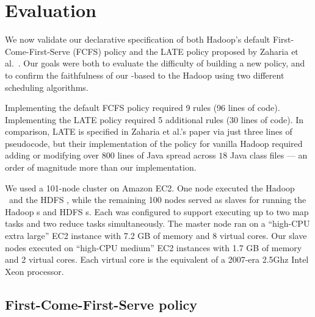 \section{Evaluation}
\label{ch:boom:sec:eval}

We now validate our declarative specification of both Hadoop's default
First-Come-First-Serve (FCFS) policy and the LATE policy proposed by Zaharia et
al.~\cite{late-sched}. Our goals were both to evaluate the difficulty of
building a new policy, and to confirm the faithfulness of our \OVERLOG-based
{\JT} to the Hadoop {\JT} using two different scheduling algorithms.

Implementing the default FCFS policy required 9 rules (96 lines of
code). Implementing the LATE policy required 5 additional \OVERLOG rules (30
lines of code). In comparison, LATE is specified in Zaharia et al.'s paper via
just three lines of pseudocode, but their implementation of the policy for
vanilla Hadoop required adding or modifying over $800$ lines of Java spread 
across $18$ Java class files --- an order of magnitude more than our \OVERLOG implementation. 

We used a 101-node cluster on Amazon EC2. One node executed the Hadoop \JT\ 
and the HDFS \NN, while the remaining 100 nodes served as slaves for running the 
Hadoop {\TT}s and HDFS {\DN}s. Each {\TT} was configured to support executing up 
to two map tasks and two reduce tasks simultaneously. The master node ran on a 
``high-CPU extra large'' EC2 instance with 7.2 GB of memory and 8 virtual cores. 
Our slave nodes executed on ``high-CPU medium'' EC2 instances with 1.7 GB of 
memory and 2 virtual cores. Each virtual core is the equivalent of a 2007-era 2.5Ghz Intel Xeon
processor.


\subsection{First-Come-First-Serve policy}

